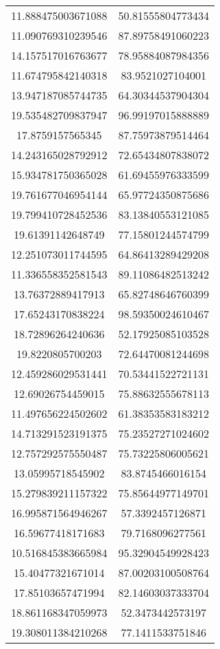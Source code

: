 \begin{table}
\begin{tabular}{cc}
11.888475003671088 & 50.81555804773434 \\
11.090769310239546 & 87.89758491060223 \\
14.157517016763677 & 78.95884087984356 \\
11.674795842140318 & 83.9521027104001 \\
13.947187085744735 & 64.30344537904304 \\
19.535482709837947 & 96.99197015888889 \\
17.8759157565345 & 87.75973879514464 \\
14.243165028792912 & 72.65434807838072 \\
15.934781750365028 & 61.69455976333599 \\
19.761677046954144 & 65.97724350875686 \\
19.799410728452536 & 83.13840553121085 \\
19.61391142648749 & 77.15801244574799 \\
12.251073011744595 & 64.86413289429208 \\
11.336558352581543 & 89.11086482513242 \\
13.76372889417913 & 65.82748646760399 \\
17.65243170838224 & 98.59350024610467 \\
18.72896264240636 & 52.17925085103528 \\
19.8220805700203 & 72.64470081244698 \\
12.459286029531441 & 70.53441522721131 \\
12.69026754459015 & 75.88632555678113 \\
11.497656224502602 & 61.38353583183212 \\
14.713291523191375 & 75.23527271024602 \\
12.757292575550487 & 75.73225806005621 \\
13.05995718545902 & 83.8745466016154 \\
15.279839211157322 & 75.85644977149701 \\
16.995871564946267 & 57.3392457126871 \\
16.59677418171683 & 79.7168096277561 \\
10.516845383665984 & 95.32904549928423 \\
15.40477321671014 & 87.00203100508764 \\
17.85103657471994 & 82.14603037333704 \\
18.861168347059973 & 52.3473442573197 \\
19.308011384210268 & 77.1411533751846 \\

\end{tabular}
\end{table}
